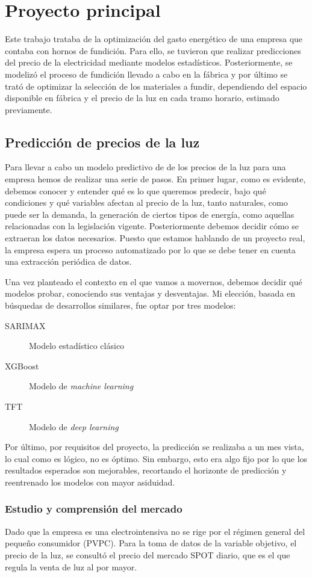 \section{Proyecto principal}
%
%
Este trabajo trataba de la optimización del gasto energético de una empresa que contaba con hornos de fundición. Para ello, se tuvieron que realizar predicciones del precio de la electricidad mediante modelos estadísticos. Posteriormente, se modelizó el proceso de fundición llevado a cabo en la fábrica y por último se trató de optimizar la selección de los materiales a fundir, dependiendo del espacio disponible en fábrica y el precio de la luz en cada tramo horario, estimado previamente.
%
%
\subsection{Predicción de precios de la luz}
%
%
%
%
Para llevar a cabo un modelo predictivo de de los precios de la luz para una empresa hemos de realizar una serie de pasos. En primer lugar, como es evidente, debemos conocer y entender qué es lo que queremos predecir, bajo qué condiciones y qué variables afectan al precio de la luz, tanto naturales, como puede ser la demanda, la generación de ciertos tipos de energía, como aquellas relacionadas con la legislación vigente. Posteriormente debemos decidir cómo se extraeran los datos necesarios. Puesto que estamos hablando de un proyecto real, la empresa espera un proceso automatizado por lo que se debe tener en cuenta una extracción periódica de datos.

Una vez planteado el contexto en el que vamos a movernos, debemos decidir qué modelos probar, conociendo sus ventajas y desventajas. Mi elección, basada en búsquedas de desarrollos similares, fue optar por tres modelos:
\begin{description}
    \item[SARIMAX] Modelo estadístico clásico
    \item[XGBoost] Modelo de \textit{machine learning}
    \item[TFT] Modelo de \textit{deep learning}
\end{description}

Por último, por requisitos del proyecto, la predicción se realizaba a un mes vista, lo cual como es lógico, no es óptimo. Sin embargo, esto era algo fijo por lo que los resultados esperados son mejorables, recortando el horizonte de predicción y reentrenado los modelos con mayor asiduidad.
%
%
%
\subsubsection{Estudio y comprensión del mercado}
%
%
%
Dado que la empresa es una electrointensiva no se rige por el régimen general del pequeño consumidor (PVPC). Para la toma de datos de la variable objetivo, el precio de la luz, se consultó el precio del mercado SPOT diario, que es el que regula la venta de luz al por mayor.

